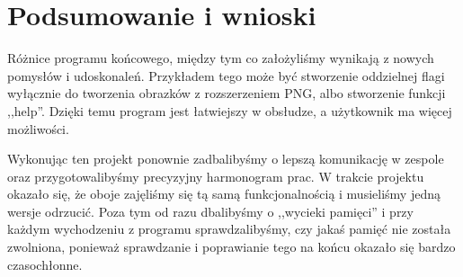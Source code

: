 \documentclass{article}
\begin{document}
\section{Podsumowanie i wnioski}

{\fontsize{14}{14}\selectfont
Różnice programu końcowego, między tym co założyliśmy wynikają z nowych pomysłów i udoskonaleń. Przykładem tego może być stworzenie oddzielnej flagi wyłącznie do tworzenia obrazków z rozszerzeniem PNG, albo stworzenie funkcji ,,help''. Dzięki temu program jest łatwiejszy w obsłudze, a użytkownik ma więcej możliwości.
\newline

Wykonując ten projekt ponownie zadbalibyśmy o lepszą komunikację w zespole oraz przygotowalibyśmy precyzyjny harmonogram prac. W trakcie projektu okazało się, że oboje zajęliśmy się tą samą funkcjonalnością i musieliśmy jedną wersje odrzucić. Poza tym od razu dbalibyśmy o ,,wycieki pamięci'' i przy każdym wychodzeniu z programu sprawdzalibyśmy, czy jakaś pamięć nie została zwolniona, ponieważ sprawdzanie i poprawianie tego na końcu okazało się bardzo czasochłonne.


}
\end{document}
